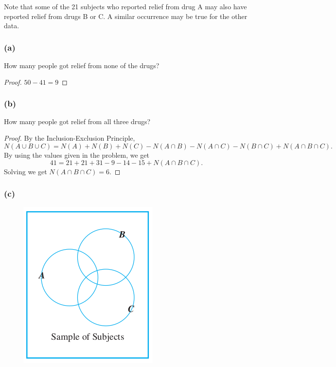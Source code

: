 \documentclass[14pt]{extarticle}
\begin{document}
Note that some of the 21 subjects who reported relief from drug A may also have reported relief from drugs B or C. A
similar occurrence may be true for the other data.

\subsubsection{(a)}
How many people got relief from none of the drugs?

\begin{proof}
     \(50-41=9\)
\end{proof}

\subsubsection{(b)}
How many people got relief from all three drugs?

\begin{proof}
     By the Inclusion-Exclusion Principle,
     \[
          N(A \cup B \cup C) = N(A) + N(B) + N(C) - N(A \cap B) - N(A \cap C) - N(B \cap C) + N(A \cap B \cap C).
     \]
     By using the values given in the problem, we get
     \[
          41 = 21 + 21 + 31 - 9 - 14 - 15 + N(A \cap B \cap C).
     \]
     Solving we get \(N(A \cap B \cap C) = 6\).
\end{proof}

\subsubsection{(c)}
\begin{figure}[ht!]
     \centering
     \includegraphics[scale=0.4]{../images/9.3.34.c.1.png}
\end{figure}
\end{document}
